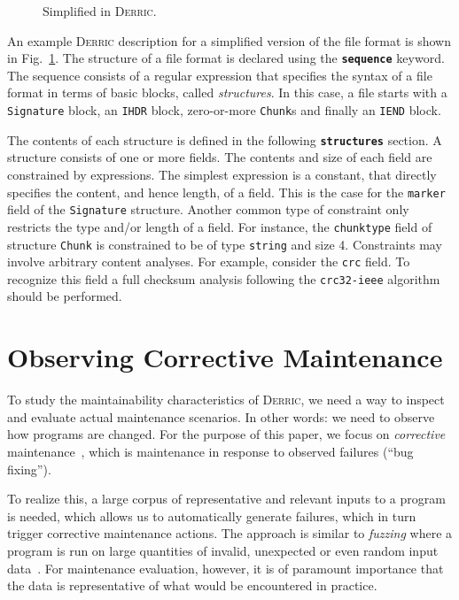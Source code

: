 \documentclass[a4paper]{llncs}
\def\derric{\textsc{Derric}\xspace}
\newcommand{\PNG}{\textsmaller{PNG}\xspace}
\newcommand{\DSL}{\textsmaller{DSL}\xspace}
\def\mykeyword#1{\textbf{\texttt{#1}}}
\def\identifier#1{\texttt{#1}}
\begin{document}
\begin{figure}[t]

\caption{Simplified \PNG in \derric.\label{FIG:png}}
\end{figure}

An example \derric description for a simplified version of the \PNG file format is shown in Fig.~\ref{FIG:png}.
The structure of a file format is declared using the \mykeyword{sequence} keyword. 
The sequence consists of a regular expression that specifies the syntax of a file format in terms of basic blocks, called \textit{structures}. 
In this case, a \PNG file starts with a \identifier{Signature} block, an \identifier{IHDR} block, zero-or-more \identifier{Chunk}s and finally an \identifier{IEND} block. 

The contents of each structure is defined in the following \mykeyword{structures} section.
A structure consists of one or more fields. 
The contents and size of each field are constrained by expressions. 
The simplest expression is a constant, that directly specifies the content, and hence length, of a field.
This is the case for the \identifier{marker} field of the \identifier{Signature} structure.
Another common type of constraint only restricts the type and/or length of a field.
For instance, the \identifier{chunktype} field of structure \identifier{Chunk} is constrained to be of type \identifier{string} and size 4.
Constraints may involve arbitrary content analyses.
For example, consider the \identifier{crc} field. 
To recognize this field a full checksum analysis following the \texttt{crc32-ieee} algorithm should be performed. 

\section{Observing Corrective Maintenance\label{sect:approach}}

\noindent
To study the maintainability characteristics of \derric, we need a way to inspect and evaluate actual maintenance scenarios. 
In other words: we need to observe how \DSL programs are changed.
For the purpose of this paper, we focus on \textit{corrective} maintenance~\cite{ISO14764}, which is maintenance in response to observed failures (``bug fixing''). 

To realize this, a large corpus of representative and relevant inputs to a \DSL program is needed, which allows us to automatically generate failures, which in turn trigger corrective maintenance actions.
The approach is similar to \textit{fuzzing} where a program is run on large quantities of invalid, unexpected or even random input data~\cite{Oehlert05}. 
For maintenance evaluation, however, it is of paramount importance that the data is representative of what would be encountered in practice.
\end{document}
